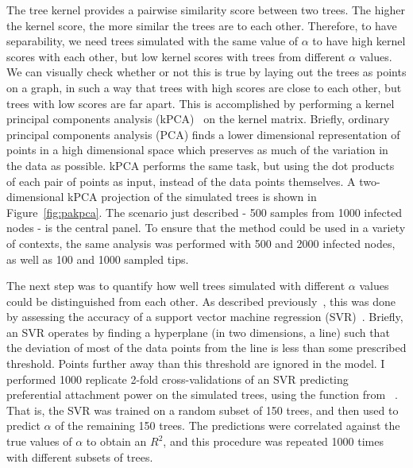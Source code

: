 The tree kernel provides a pairwise similarity score between two trees. The
higher the kernel score, the more similar the trees are to each other.
Therefore, to have separability, we need trees simulated with the same value of
$\alpha$ to have high kernel scores with each other, but low kernel scores with
trees from different $\alpha$ values. We can visually check whether or not this
is true by laying out the trees as points on a graph, in such a way that trees
with high scores are close to each other, but trees with low scores are far
apart. This is accomplished by performing a kernel principal components
analysis (kPCA)~\autocite{scholkopf1998nonlinear} on the kernel matrix.
Briefly, ordinary principal components analysis (PCA) finds a lower dimensional
representation of points in a high dimensional space which preserves as much of
the variation in the data as possible. kPCA performs the same task, but using
the dot products of each pair of points as input, instead of the data points
themselves. A two-dimensional kPCA projection of the simulated trees is shown
in Figure~\ref{fig:pakpca}. The scenario just described - 500 samples from 1000
infected nodes - is the central panel. To ensure that the method could be used
in a variety of contexts, the same analysis was performed with 500 and 2000
infected nodes, as well as 100 and 1000 sampled tips. 

The next step was to quantify how well trees simulated with different $\alpha$
values could be distinguished from each other. As described
previously~\autocite{poon2015phylodynamic}, this was done by assessing the
accuracy of a support vector machine regression
(SVR)~\autocite{smola1997support}. Briefly, an SVR operates by finding a
hyperplane (in two dimensions, a line) such that the deviation of most of the
data points from the line is less than some prescribed threshold. Points
further away than this threshold are ignored in the model. I performed 1000
replicate 2-fold cross-validations of an SVR predicting preferential attachment
power on the simulated trees, using the  function from
~\autocite{karatzoglou2004kernlab}. That is, the SVR was
trained on a random subset of 150 trees, and then used to predict $\alpha$ of
the remaining 150 trees. The predictions were correlated against the true
values of $\alpha$ to obtain an $R^2$, and this procedure was repeated 1000
times with different subsets of trees.

